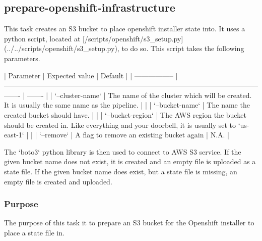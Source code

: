 \subsection{prepare-openshift-infrastructure}\label{subsec:prepare-openshift-infrastructure}

This task creates an S3 bucket to place openshift installer state into.
It uses a python script, located at [/scripts/openshift/s3_setup.py](../../scripts/openshift/s3_setup.py), to do so.
This script takes the following parameters.

| Parameter         | Expected value                                                                                                      | Default |
| ----------------- | ------------------------------------------------------------------------------------------------------------------- | ------- |
| `--cluster-name`  | The name of the cluster which will be created. It is usually the same name as the pipeline.                         |         |
| `--bucket-name`   | The name the created bucket should have.                                                                            |         |
| `--bucket-region` | The AWS region the bucket should be created in. Like everything and your doorbell, it is usually set to `us-east-1` |         |
| `--remove`        | A flag to remove an existing bucket again                                                                           | N.A.    |

The `boto3` python library is then used to connect to AWS S3 service.
If the given bucket name does not exist, it is created and an empty file is uploaded as a state file.
If the given bucket name does exist, but a state file is missing, an empty file is created and uploaded.

\subsubsection{Purpose}\label{subsubsec:prepare-openshift-infrastructure-Purpose}

The purpose of this task it to prepare an S3 bucket for the Openshift installer to place a state file in.
